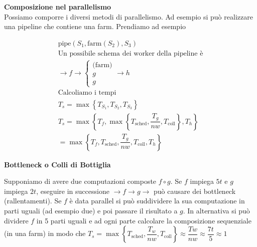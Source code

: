 

\begin{defn}
	
	\textbf{Composizione nel parallelismo} \\
	
	Possiamo comporre i diversi metodi di parallelismo. Ad esempio si può realizzare
	una pipeline che contiene una farm. Prendiamo ad esempio
	
	\[ \begin{aligned}
	\text{pipe}(S_1, \text{farm}(S_2), S_3) \\
	\text{Un possibile schema dei worker della pipeline è} \\
	\to f \to \begin{cases}
	\text{(farm)} \\
	g \\ g \end{cases} \to h \\
	\text{Calcoliamo i tempi} \\
	T_s = \max\left\{T_{S_1}, T_{S_2}, T_{S_3}\right\} \\
	T_s = \max\left\{T_f, \max\left\{T_\text{sched}, \dfrac{T_g}{nw},
	T_\text{coll}\right\}, T_h \right\} \\
	= \max\left\{T_f, T_\text{sched}, \dfrac{T_g}{nw}, T_\text{coll}, T_h \right\}
	\end{aligned} \]
	
\end{defn}

\begin{defn}
	\textbf{Bottleneck o Colli di Bottiglia}

	Supponiamo di avere due computazioni composte $ f \circ g $. Se $ f $
	impiega $ 5t $ e $ g $ impiega $ 2t $, eseguire in successione $ \to f \to g
	\to $ può causare dei bottleneck (rallentamenti). Se $ f $ è data parallel
	si può suddividere la sua computazione in parti uguali (ad esempio due) e
	poi passare il risultato a $ g $. In alternativa si può dividere $ f $ in 5
	parti uguali e ad ogni parte calcolare la composizione sequenziale (in una
	farm) in modo che $ T_s = \max\left\{T_\text{sched}, \dfrac{T_w}{nw},
	T_\text{coll}\right\} \approx \dfrac{Tw}{nw} \approx \dfrac{7t}{5} \approx
	1$

\end{defn}

